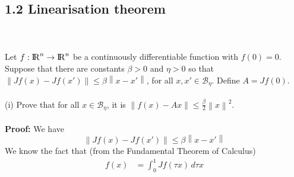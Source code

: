 \documentclass[a4paper,11pt,reqno]{amsart}
\newcommand{\R}{{\rm I\!R}}
\begin{document}
\subsection*{1.2 Linearisation theorem}\label{sec:q2}
\
\\ \\
Let $f:\R^n\to\R^n$ be a continuously differentiable function with $f(0)=0$. Suppose that there are constants $\beta>0$ and $\eta>0$ so that $\left\lVert Jf(x)-Jf(x')\right\rVert \leq\beta\left\lVert x-x'\right\rVert $, for all $x, x'\in \mathcal{B}_{\eta}$. Define $A=Jf(0)$.
\\ \\
(i) Prove that for all $x\in \mathcal{B}_{\eta}$, it is $\left\lVert f(x)-Ax\right\rVert \leq \frac{\beta}{2}\left\lVert x\right\rVert ^2$.
\\ \\
\textbf{Proof:} We have
\begin{equation}
    \left\lVert Jf(x)-Jf(x')\right\rVert \leq\beta\left\lVert x-x'\right\rVert 
\end{equation}
We know the fact that (from the Fundamental Theorem of Calculus)
\begin{align}
    f(x)&=\int_{0}^{1}Jf(\tau x)  \,d\tau x 
\end{align}
\end{document}
